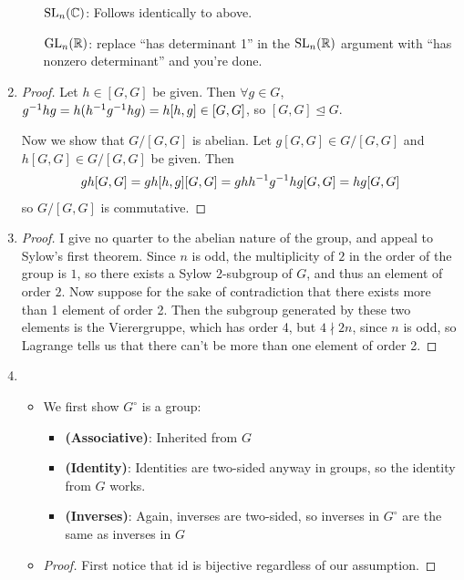 \documentclass[12pt, twosided]{article}
\begin{document}
\begin{enumerate}
\begin{itemize}
  \item [\(\mathrm{SL}_n(\mathbb{C})\):] Follows identically to above.
  \item [\(\mathrm{GL}_n(\mathbb{R})\):] replace ``has determinant 1'' in the \(\mathrm{SL}_n(\mathbb{R})\) argument with ``has nonzero determinant'' and you're done.
  \end{itemize}
\item
  \begin{proof}
    Let \(h \in [G, G]\) be given. Then \(\forall g\in G\), \(g^{-1}hg = h(h^{-1}g^{-1}hg) = h[h, g] \in [G, G]\), so \([G, G] \trianglelefteq G\). \partdone

    Now we show that \(G/[G,G]\) is abelian. Let \(g[G, G] \in G/[G,G]\) and \(h[G, G] \in G/[G,G]\) be given. Then
    \begin{align*}
      gh[G,G] = gh[h,g][G,G] = ghh^{-1}g^{-1}hg[G,G] = hg[G,G]
    \end{align*}
    so \(G/[G,G]\) is commutative.
  \end{proof}
\item
  \begin{proof}
    I give no quarter to the abelian nature of the group, and appeal to Sylow's first theorem. Since \(n\) is odd, the multiplicity of \(2\) in the order of the group is \(1\), so there exists a Sylow 2-subgroup of \(G\), and thus an element of order \(2\). Now suppose for the sake of contradiction that there exists more than 1 element of order 2. Then the subgroup generated by these two elements is the Vierergruppe, which has order 4, but \(4 \nmid 2n\), since \(n\) is odd, so Lagrange tells us that there can't be more than one element of order 2.
  \end{proof}
\item
  \begin{itemize}
  \item We first show \(G^\circ\) is a group:
    \begin{itemize}
    \item \textbf{(Associative)}: Inherited from \(G\)
    \item \textbf{(Identity)}: Identities are two-sided anyway in groups, so the identity from \(G\) works.
    \item \textbf{(Inverses)}: Again, inverses are two-sided, so inverses in \(G^\circ\) are the same as inverses in \(G\)
    \end{itemize}
  \item
    \begin{proof}
      First notice that \(\mathrm{id}\) is bijective regardless of our assumption.

\end{proof}
\end{itemize}
\end{enumerate}
\end{document}
